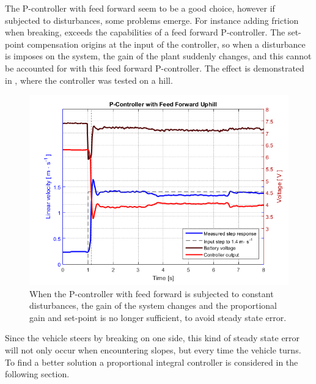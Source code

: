 The P-controller with feed forward seem to be a good choice, however if subjected to disturbances, some problems emerge. For instance adding friction when breaking, exceeds the capabilities of a feed forward P-controller. The set-point compensation origins at the input of the controller, so when a disturbance is imposes on the system, the gain of the plant suddenly changes, and this cannot be accounted for with this feed forward P-controller. The effect is demonstrated in , where the controller was tested on a hill.
%
\begin{figure}[H]
 	\centering
 	\includegraphics[width=.8\textwidth]{figures/hillPfeedForward}
 	\caption{When the P-controller with feed forward is subjected to constant disturbances, the gain of the system changes and the proportional gain and set-point is no longer sufficient, to avoid steady state error.}
 	\label{fig:hillPfeedForward}
\end{figure}
%
Since the vehicle steers by breaking on one side, this kind of steady state error will not only occur when encountering slopes, but every time the vehicle turns. To find a better solution a proportional integral controller is considered in the following section.
%
